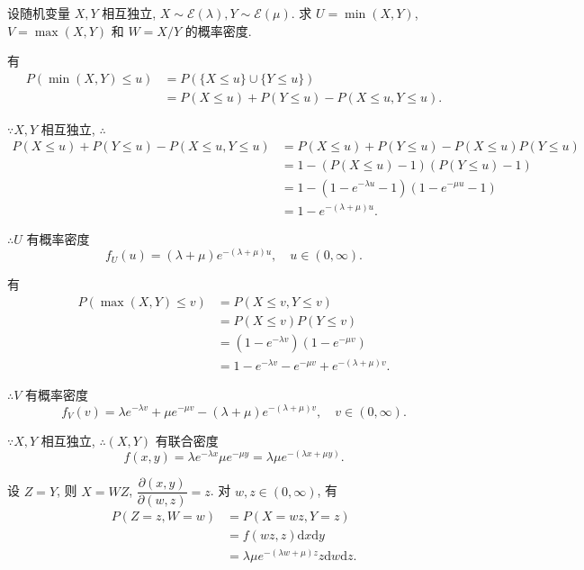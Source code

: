 \documentclass{ctexart}
\begin{document}
\begin{exercise}%
    设随机变量 $X,Y$ 相互独立, $X\sim\mathcal{E}(\lambda),Y\sim\mathcal{E}(\mu)$. 求 $U=\min(X,Y)$, $V=\max(X,Y)$ 和 $W=X/Y$ 的概率密度.
\end{exercise}
\begin{solution}
    有
    \begin{align*}
        P(\min(X,Y)\leq u) & =P(\{X\leq u\}\cup\{Y\leq u\}) \\
        & =P(X\leq u)+P(Y\leq u)-P(X\leq u,Y\leq u).
    \end{align*}

    $\because X,Y$ 相互独立, $\therefore$
    \begin{align*}
        P(X\leq u)+P(Y\leq u)-P(X\leq u,Y\leq u) & =P(X\leq u)+P(Y\leq u)-P(X\leq u)P(Y\leq u) \\
        & =1-(P(X\leq u)-1)(P(Y\leq u)-1) \\
        & =1-(1-e^{-\lambda u}-1)(1-e^{-\mu u}-1) \\
        & =1-e^{-(\lambda+\mu)u}.
    \end{align*}

    $\therefore U$ 有概率密度
    \[f_U(u)=(\lambda+\mu)e^{-(\lambda+\mu)u},\quad u\in(0,\infty).\]

    有
    \begin{align*}
        P(\max(X,Y)\leq v) & =P(X\leq v,Y\leq v) \\
        & =P(X\leq v)P(Y\leq v) \\
        & =(1-e^{-\lambda v})(1-e^{-\mu v}) \\
        & =1-e^{-\lambda v}-e^{-\mu v}+e^{-(\lambda+\mu)v}.
    \end{align*}

    $\therefore V$ 有概率密度
    \[f_V(v)=\lambda e^{-\lambda v}+\mu e^{-\mu v}-(\lambda+\mu)e^{-(\lambda+\mu)v},\quad v\in(0,\infty).\]

    $\because X,Y$ 相互独立, $\therefore(X,Y)$ 有联合密度
    \[f(x,y)=\lambda e^{-\lambda x}\mu e^{-\mu y}=\lambda\mu e^{-(\lambda x+\mu y)}.\]

    设 $Z=Y$, 则 $X=WZ$, $\dfrac{\partial(x,y)}{\partial(w,z)}=z$. 对 $w,z\in(0,\infty)$, 有
    \begin{align*}
        P(Z=z,W=w) & =P(X=wz,Y=z) \\
        & =f(wz,z)\mathrm{d}x\mathrm{d}y \\
        & =\lambda\mu e^{-(\lambda w+\mu)z}z\mathrm{d}w\mathrm{d}z.
    \end{align*}


\end{solution}
\end{document}
